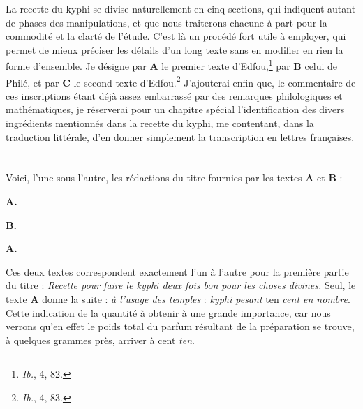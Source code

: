 \documentclass[a4paper, 11pt, oneside]{article}
\newcommand*\hieroAAAE{}
\newcommand*\hieroAAAI{}
\newcommand*\hieroAAAR{}
\newcommand*\hieroAABT{}
\newcommand*\hieroAADL{}
\newcommand*\hieroAAED{}
\newcommand*\hieroAAEG{}
\newcommand*\hieroAAEI{}
\newcommand*\hieroAAEJ{}
\newcommand*\hieroAAEK{}
\newcommand*\hieroAAEL{}
\newcommand*\hieroAAEM{}
\newcommand*\hieroAAEO{}
\newcommand*\hieroAAER{}
\newcommand*\hieroAAES{}
\newcommand*\hieroAAET{}
\newcommand*\hieroAAEU{}
\newcommand*\hieroAAEV{}
\newcommand*\hieroAAEW{}
\newcommand*\hieroAAEX{}
\newcommand*\hieroAAEY{}
\newcommand*\hieroAAEZ{}
\newcommand*\hieroAAFA{}
\begin{document}
La recette du kyphi se divise naturellement en cinq sections, qui indiquent autant de phases des manipulations, et que nous traiterons chacune à part pour la commodité et la clarté de l'étude. C'est là un procédé fort utile à employer, qui permet de mieux préciser les détails d'un long texte sans en modifier en rien la forme d'ensemble. Je désigne par \textbf{A} le premier texte d'Edfou,\footnote{\emph{Ib.}, 4, 82.} par \textbf{B} celui de Philé, et par \textbf{C} le second texte d'Edfou.\footnote{\emph{Ib.}, 4, 83.} J'ajouterai enfin que, le commentaire de ces inscriptions étant déjà assez embarrassé par des remarques philologiques et mathématiques, je réserverai pour un chapitre spécial l'identification des divers ingrédients mentionnés dans la recette du kyphi, me contentant, dans la traduction littérale, d'en donner simplement la transcription en lettres françaises.
\clearpage
\section{}
\paragraph{}
Voici, l'une sous l'autre, les rédactions du titre fournies par les textes \textbf{A} et \textbf{B} :

\hspace*{10mm}\textbf{A.}\hspace*{5mm} $\hieroAAER\:\hieroAAES\:\hieroAABT\:\hieroAAET\:\hieroAAAE\:\hieroAAAR\:\hieroAAEJ\:\hieroAAEG\:\hieroAAED\:\hieroAAAI\:\hieroAAEU\:\hieroAAEV\:\hieroAAEI\:\hieroAAEW\:\hieroAABT\:\hieroAAAE\:\hieroAAAR\:\hieroAAEX$

\hspace*{10mm}\textbf{B.}\hspace*{5mm} $\hieroAAEY\:\hieroAAES\:\hieroAADL\:\hieroAAET\:\hieroAAEK\:\hieroAAEL\:\hieroAAEG\:\hieroAAEG\:\hieroAAEM\:\hieroAAAI\:\hieroAAEZ\:\hieroAADL\:\hieroAAEO$

\hspace*{10mm}\textbf{A.}\hspace*{5mm} $\hieroAAFA\:\hieroAABT$

Ces deux textes correspondent exactement l'un à l'autre pour la première partie du titre : \emph{Recette pour faire le kyphi deux fois bon pour les choses divines.} Seul, le texte \textbf{A} donne la suite : \emph{à l'usage des temples} : \emph{kyphi pesant} ten \emph{cent en nombre}. Cette indication de la quantité à obtenir à une grande importance, car nous verrons qu'en effet le poids total du parfum résultant de la préparation se trouve, à quelques grammes près, arriver à cent \emph{ten}. 
\end{document}
